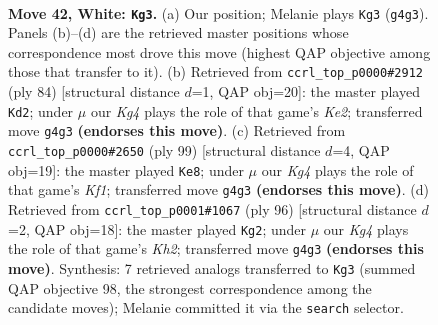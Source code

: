 \documentclass[11pt]{article}
\begin{document}
\clearpage

\begin{figure}[p]\centering
\begin{subfigure}{0.46\textwidth}\centering
\resizebox{\linewidth}{!}{%
\newchessgame
\chessboard[
  setfen={6k1/R7/8/8/p5K1/P7/7r/8 w - - 8 42},
  showmover=false,
  pgfstyle=straightmove, color=movearrow, markmove={g4-g3}
]}
\caption{}
\end{subfigure}\hfill
\begin{subfigure}{0.46\textwidth}\centering
\resizebox{\linewidth}{!}{%
\newchessgame
\chessboard[
  setfen={5r2/7R/8/8/4k2p/8/4K1P1/8 w - - 3 43},
  showmover=false,
  pgfstyle=straightmove, color=movearrow, markmove={e2-d2}
]}
\caption{}
\end{subfigure}
\\[4pt]
\begin{subfigure}{0.46\textwidth}\centering
\resizebox{\linewidth}{!}{%
\newchessgame
\chessboard[
  setfen={5k2/8/8/P7/8/2P2K2/r7/1R6 b - - 4 50},
  showmover=false,
  pgfstyle=straightmove, color=movearrow, markmove={f8-e8}
]}
\caption{}
\end{subfigure}\hfill
\begin{subfigure}{0.46\textwidth}\centering
\resizebox{\linewidth}{!}{%
\newchessgame
\chessboard[
  setfen={6R1/8/8/4k1p1/8/8/5P1K/3r4 w - - 8 49},
  showmover=false,
  pgfstyle=straightmove, color=movearrow, markmove={h2-g2}
]}
\caption{}
\end{subfigure}
\caption{\textbf{Move 42, White: \texttt{Kg3}.} (a) Our position; Melanie plays \texttt{Kg3} (\texttt{g4g3}). Panels (b)--(d) are the retrieved master positions whose correspondence most drove this move (highest QAP objective among those that transfer to it). (b) Retrieved from \texttt{ccrl\_top\_p0000\#2912} (ply 84) [structural distance $d$=1, QAP obj=20]: the master played \texttt{Kd2}; under $\mu$ our \emph{Kg4} plays the role of that game's \emph{Ke2}; transferred move \texttt{g4g3} \textbf{(endorses this move)}. (c) Retrieved from \texttt{ccrl\_top\_p0000\#2650} (ply 99) [structural distance $d$=4, QAP obj=19]: the master played \texttt{Ke8}; under $\mu$ our \emph{Kg4} plays the role of that game's \emph{Kf1}; transferred move \texttt{g4g3} \textbf{(endorses this move)}. (d) Retrieved from \texttt{ccrl\_top\_p0001\#1067} (ply 96) [structural distance $d$=2, QAP obj=18]: the master played \texttt{Kg2}; under $\mu$ our \emph{Kg4} plays the role of that game's \emph{Kh2}; transferred move \texttt{g4g3} \textbf{(endorses this move)}. Synthesis: 7 retrieved analogs transferred to \texttt{Kg3} (summed QAP objective 98, the strongest correspondence among the candidate moves); Melanie committed it via the \texttt{search} selector.}
\label{fig:thought-m82}
\end{figure}
\end{document}
